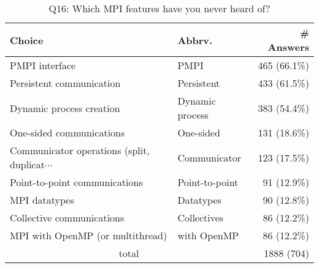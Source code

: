 \begin{table}[htb]%
\begin{center}%
\caption{Q16: Which MPI features have you never heard of?}%
\label{tab:Q16-ans}%
\begin{tabular}{l|l|r}%
\hline%
Choice & Abbrv. & \# Answers \\%
\hline%
PMPI interface & PMPI & 465 (66.1\%) \\%
Persistent communication & Persistent & 433 (61.5\%) \\%
Dynamic process creation & Dynamic process & 383 (54.4\%) \\%
One-sided communications & One-sided & 131 (18.6\%) \\%
{\small Communicator operations (split, duplicat$\cdots$} & Communicator & 123 (17.5\%) \\%
Point-to-point communications & Point-to-point & 91 (12.9\%) \\%
MPI datatypes & Datatypes & 90 (12.8\%) \\%
Collective communications & Collectives & 86 (12.2\%) \\%
MPI with OpenMP (or multithread) & with OpenMP & 86 (12.2\%) \\%
\hline%
\multicolumn{2}{c}{total} & 1888 (704)\\%
\hline%
\end{tabular}%
\end{center}%
\end{table}%
